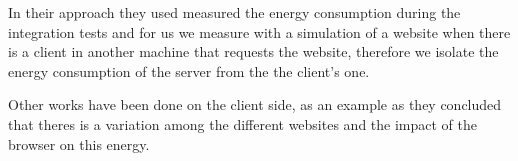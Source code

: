 In their approach they used measured the energy consumption during the integration tests and for us we measure with a simulation of a website when there is a client in another machine that requests the website, therefore we isolate the energy consumption of the server from the the client's one.


Other works have been done on the client side, as an example \cite{philippot_characterization_2014} as they concluded that theres is a variation among the different websites and the impact of the browser on this energy.




